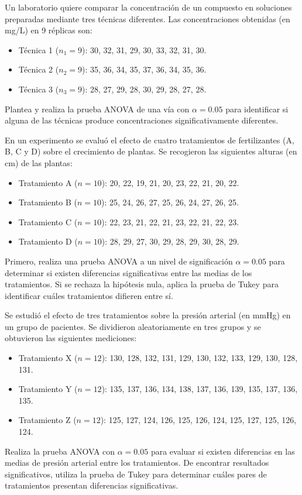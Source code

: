 \documentclass[addpoints,12pt]{exam}
\theoremstyle{plain}
\theoremstyle{remark}
\theoremstyle{definition}
\begin{document}
\begin{questions}
 \question Un laboratorio quiere comparar la concentración de un compuesto en soluciones preparadas mediante tres técnicas diferentes. Las concentraciones obtenidas (en mg/L) en 9 réplicas son:
    \begin{itemize}
        \item Técnica 1 (\(n_1 = 9\)): 30, 32, 31, 29, 30, 33, 32, 31, 30.
        \item Técnica 2 (\(n_2 = 9\)): 35, 36, 34, 35, 37, 36, 34, 35, 36.
        \item Técnica 3 (\(n_3 = 9\)): 28, 27, 29, 28, 30, 29, 28, 27, 28.
    \end{itemize}
    Plantea y realiza la prueba ANOVA de una vía con \(\alpha = 0.05\) para identificar si alguna de las técnicas produce concentraciones significativamente diferentes.



 \question En un experimento se evaluó el efecto de cuatro tratamientos de fertilizantes (A, B, C y D) sobre el crecimiento de plantas. Se recogieron las siguientes alturas (en cm) de las plantas:
    \begin{itemize}
        \item Tratamiento A (\(n=10\)): 20, 22, 19, 21, 20, 23, 22, 21, 20, 22.
        \item Tratamiento B (\(n=10\)): 25, 24, 26, 27, 25, 26, 24, 27, 26, 25.
        \item Tratamiento C (\(n=10\)): 22, 23, 21, 22, 21, 23, 22, 21, 22, 23.
        \item Tratamiento D (\(n=10\)): 28, 29, 27, 30, 29, 28, 29, 30, 28, 29.
    \end{itemize}
    Primero, realiza una prueba ANOVA a un nivel de significación \(\alpha = 0.05\) para determinar si existen diferencias significativas entre las medias de los tratamientos. Si se rechaza la hipótesis nula, aplica la prueba de Tukey para identificar cuáles tratamientos difieren entre sí.

 \question  Se estudió el efecto de tres tratamientos sobre la presión arterial (en mmHg) en un grupo de pacientes. Se dividieron aleatoriamente en tres grupos y se obtuvieron las siguientes mediciones:
    \begin{itemize}
        \item Tratamiento X (\(n=12\)): 130, 128, 132, 131, 129, 130, 132, 133, 129, 130, 128, 131.
        \item Tratamiento Y (\(n=12\)): 135, 137, 136, 134, 138, 137, 136, 139, 135, 137, 136, 135.
        \item Tratamiento Z (\(n=12\)): 125, 127, 124, 126, 125, 126, 124, 125, 127, 125, 126, 124.
    \end{itemize}
    Realiza la prueba ANOVA con \(\alpha = 0.05\) para evaluar si existen diferencias en las medias de presión arterial entre los tratamientos. De encontrar resultados significativos, utiliza la prueba de Tukey para determinar cuáles pares de tratamientos presentan diferencias significativas.


\end{questions}
\end{document}
